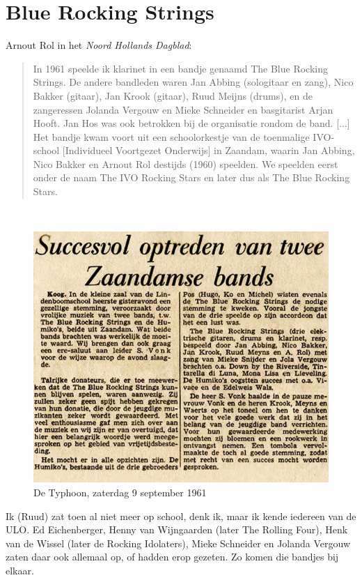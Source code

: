 \documentclass[12pt,twoside, openright]{memoir}
\begin{document}
\section*{Blue Rocking Strings} %
\label{cha:bluerocking}

Arnout Rol in het \emph{Noord Hollands Dagblad}: 

\begin{quote}
In 1961 speelde ik klarinet in een bandje genaamd The Blue Rocking Strings. De andere bandleden waren Jan Abbing (sologitaar en zang), Nico Bakker (gitaar), Jan Krook (gitaar), Ruud Meijns (drums), en de zangeressen Jolanda Vergouw en Mieke Schneider en basgitarist Arjan Hooft. Jan Hos was ook betrokken bij de organisatie rondom de band. [...] Het bandje kwam voort uit een schoolorkestje van de toenmalige IVO-school [Individueel Voortgezet Onderwijs] in Zaandam, waarin Jan Abbing, Nico Bakker en Arnout Rol destijds (1960) speelden. We speelden eerst onder de naam The IVO Rocking Stars en later dus als The Blue Rocking Stars.
\end{quote}
 
\begin{figure}
\centering
\includegraphics[width=\textwidth]{img/ch25/bluerocking}
\caption*{\footnotesize De Typhoon, zaterdag 9 september 1961}
\end{figure}

\noindent Ik (Ruud) zat toen al niet meer op school, denk ik, maar ik kende iedereen van de ULO. Ed Eichenberger, Henny van Wijngaarden (later The Rolling Four), Henk van de Wissel (later de Rocking Idolaters), Mieke Schneider en Jolanda Vergouw zaten daar ook allemaal op, of hadden erop gezeten. Zo komen die bandjes bij elkaar.
\end{document}

